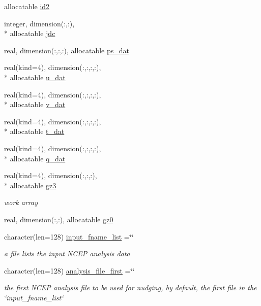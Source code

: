 \begin{DoxyCompactItemize}
allocatable \hyperlink{classfv__nwp__nudge__mod_a10d50bc3c563bcc270ef37108729f381}{id2}
\item 
integer, dimension(\-:,\-:), \\*
allocatable \hyperlink{classfv__nwp__nudge__mod_a046fc8ca32888e97b3af454cfca83aae}{jdc}
\item 
real, dimension(\-:,\-:,\-:), allocatable \hyperlink{classfv__nwp__nudge__mod_a31198eb99e726ad2b0eaf4897791206c}{ps\-\_\-dat}
\item 
real(kind=4), dimension(\-:,\-:,\-:,\-:), \\*
allocatable \hyperlink{classfv__nwp__nudge__mod_aba770ddb7a91e298a5a6717f65da570a}{u\-\_\-dat}
\item 
real(kind=4), dimension(\-:,\-:,\-:,\-:), \\*
allocatable \hyperlink{classfv__nwp__nudge__mod_a9d2249df35c01840bdff1c2f9b9f2af7}{v\-\_\-dat}
\item 
real(kind=4), dimension(\-:,\-:,\-:,\-:), \\*
allocatable \hyperlink{classfv__nwp__nudge__mod_afa50769b448c5878d107da994e63d234}{t\-\_\-dat}
\item 
real(kind=4), dimension(\-:,\-:,\-:,\-:), \\*
allocatable \hyperlink{classfv__nwp__nudge__mod_a35d70de0bf27001249d55b96b2cd229c}{q\-\_\-dat}
\item 
real(kind=4), dimension(\-:,\-:,\-:), \\*
allocatable \hyperlink{classfv__nwp__nudge__mod_a732a8eaade4984925290ea5b5372a8fe}{gz3}
\begin{DoxyCompactList}\small\item\em work array \end{DoxyCompactList}\item 
real, dimension(\-:,\-:), allocatable \hyperlink{classfv__nwp__nudge__mod_adb43d826a6835d384402078dd0280d5b}{gz0}
\item 
character(len=128) \hyperlink{classfv__nwp__nudge__mod_a6c78d433ff14d2b612633c8855f85e6c}{input\-\_\-fname\-\_\-list} =\char`\"{}\char`\"{}
\begin{DoxyCompactList}\small\item\em a file lists the input N\-C\-E\-P analysis data \end{DoxyCompactList}\item 
character(len=128) \hyperlink{classfv__nwp__nudge__mod_aa599ebe974dc91c791f9b5a81c75d59b}{analysis\-\_\-file\-\_\-first} =\char`\"{}\char`\"{}
\begin{DoxyCompactList}\small\item\em the first N\-C\-E\-P analysis file to be used for nudging, by default, the first file in the \char`\"{}input\-\_\-fname\-\_\-list\char`\"{} \end{DoxyCompactList}\item 

\end{DoxyCompactItemize}
